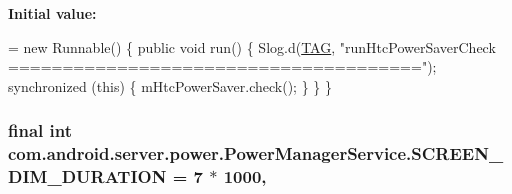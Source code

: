 {\bfseries Initial value\-:}
\begin{DoxyCode}
= \textcolor{keyword}{new} Runnable() \{
        \textcolor{keyword}{public} \textcolor{keywordtype}{void} run() \{
            Slog.d(\hyperlink{classcom_1_1android_1_1server_1_1power_1_1PowerManagerService_a295d19078e6db3689fe23a04e2da2cfb}{TAG}, \textcolor{stringliteral}{"runHtcPowerSaverCheck ======================================"});     
            \textcolor{keyword}{synchronized} (\textcolor{keyword}{this}) \{          
                mHtcPowerSaver.check();
            \}
        \}
    \}
\end{DoxyCode}
\hypertarget{classcom_1_1android_1_1server_1_1power_1_1PowerManagerService_a053c695398140f41d61a1816d6244155}{
\subsubsection[{S\-C\-R\-E\-E\-N\-\_\-\-D\-I\-M\-\_\-\-D\-U\-R\-A\-T\-I\-O\-N}]{\setlength{\rightskip}{0pt plus 5cm}final int com.\-android.\-server.\-power.\-Power\-Manager\-Service.\-S\-C\-R\-E\-E\-N\-\_\-\-D\-I\-M\-\_\-\-D\-U\-R\-A\-T\-I\-O\-N = 7 $\ast$ 1000\hspace{0.3cm}{\ttfamily [static]}, {\ttfamily [private]}}}\label{classcom_1_1android_1_1server_1_1power_1_1PowerManagerService_a053c695398140f41d61a1816d6244155}
